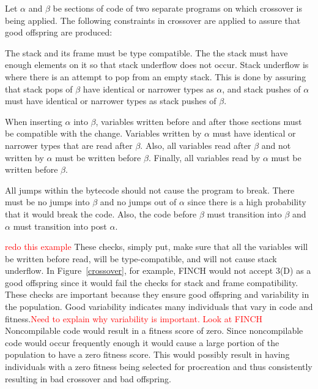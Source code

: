 \documentclass{sig-alternate}
\newcommand{\mycomment}[1]{\textcolor{red}{#1}}
\begin{document}
Let $\alpha$ and $\beta$ be sections of code of two separate programs on which crossover is being applied.
The following constraints in crossover are applied to assure that good offspring are produced:\par

The stack and its frame must be type compatible. The the stack must have enough elements on it so that stack underflow does not occur. Stack underflow is where there is an attempt to pop from an empty stack. This is done by assuring that stack pops of $\beta$ have identical or narrower types as $\alpha$, and stack pushes of $\alpha$ must have identical or narrower types as stack pushes of $\beta$. \par

When inserting $\alpha$ into $\beta$, variables written before and after those sections must be compatible with the change. Variables written by $\alpha$ must have identical or narrower types that are read after $\beta$. Also, all variables read after $\beta$ and not written by $\alpha$ must be written before $\beta$. Finally, all variables read by $\alpha$ must be written before $\beta$.\par

All jumps within the bytecode should not cause the program to break. There must be no jumps into $\beta$ and no jumps out of $\alpha$ since there is a high probability that it would break the code. Also, the code before $\beta$ must transition into $\beta$ and $\alpha$ must transition into post $\alpha$.\par

\mycomment{redo this example}
These checks, simply put, make sure that all the variables will be written before read, will be type-compatible, and will not cause stack underflow\cite{FINCH2:2009}. In Figure~\ref{crossover}, for example, FINCH would not accept 3(D) as a good offspring since it would fail the checks for stack and frame compatibility.
These checks are important because they ensure good offspring and variability in the population. Good variability indicates many individuals that vary in code and fitness.\mycomment{Need to explain why variability is important. Look at FINCH} Noncompilable code would result in a fitness score of zero. Since noncompilable code would occur frequently enough it would cause a large portion of the population to have a zero fitness score. This would possibly result in having individuals with a zero fitness being selected for procreation and thus consistently resulting in bad crossover and bad offspring.
\end{document}
